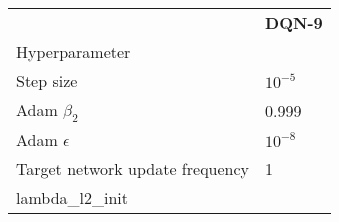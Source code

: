 \begin{tabular}{ll}
 & \bfseries DQN-9 \\
Hyperparameter &  \\
Step size & $10^{-5}$ \\
Adam $\beta_2$ & 0.999 \\
Adam $\epsilon$ & $10^{-8}$ \\
Target network update frequency & 1 \\
lambda_l2_init &  \\
\end{tabular}
